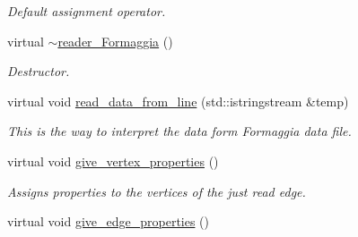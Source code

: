 \begin{DoxyCompactItemize}
\begin{DoxyCompactList}\small\item\em Default assignment operator. \item\end{DoxyCompactList}\item 
\hypertarget{classreader__Formaggia_a615935d7fcbc7fa00bec6499c19ecbb8}{
virtual \hyperlink{classreader__Formaggia_a615935d7fcbc7fa00bec6499c19ecbb8}{$\sim$reader\_\-Formaggia} ()}
\label{classreader__Formaggia_a615935d7fcbc7fa00bec6499c19ecbb8}

\begin{DoxyCompactList}\small\item\em Destructor. \item\end{DoxyCompactList}\item 
\hypertarget{classreader__Formaggia_aa00e80225217ae49a913e002fa8a16b6}{
virtual void \hyperlink{classreader__Formaggia_aa00e80225217ae49a913e002fa8a16b6}{read\_\-data\_\-from\_\-line} (std::istringstream \&temp)}
\label{classreader__Formaggia_aa00e80225217ae49a913e002fa8a16b6}

\begin{DoxyCompactList}\small\item\em This is the way to interpret the data form Formaggia data file. \item\end{DoxyCompactList}\item 
\hypertarget{classreader__Formaggia_a0d732cd7f6436ea30b1146cf517c9c87}{
virtual void \hyperlink{classreader__Formaggia_a0d732cd7f6436ea30b1146cf517c9c87}{give\_\-vertex\_\-properties} ()}
\label{classreader__Formaggia_a0d732cd7f6436ea30b1146cf517c9c87}

\begin{DoxyCompactList}\small\item\em Assigns properties to the vertices of the just read edge. \item\end{DoxyCompactList}\item 
\hypertarget{classreader__Formaggia_a8e69da0e5ae40227a7fc5ce7e46bc2fc}{
virtual void \hyperlink{classreader__Formaggia_a8e69da0e5ae40227a7fc5ce7e46bc2fc}{give\_\-edge\_\-properties} ()}
\label{classreader__Formaggia_a8e69da0e5ae40227a7fc5ce7e46bc2fc}


\end{DoxyCompactItemize}
